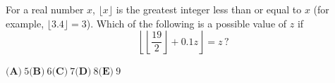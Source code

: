 For a real number $x$, $\lfloor x\rfloor$ is the greatest integer less than or equal to $x$ (for example, $\lfloor3.4\rfloor=3$). Which of the following is a possible value of $z$ if
\[\left\lfloor\left\lfloor\dfrac{19}{2}\right\rfloor+0.1z\right\rfloor=z\,?\]

$\textbf{(A)}\ 5$\qquad$\textbf{(B)}\ 6$\qquad$\textbf{(C)}\ 7$\qquad$\textbf{(D)}\ 8$\qquad$\textbf{(E)}\ 9$
